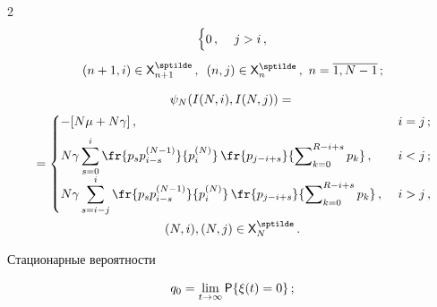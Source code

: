 \begin{multicols}{2}
\begin{multline}
\begin{cases}
  0\,, &\ j>i\,,

  \end{cases}\\[5pt]

    (n+1,i)\in {\sf X}^{\sptilde}_{n+1}\,,\enskip

  (n,j)\in {\sf X}_n^{\sptilde}\,,\ n=\overline{1,N-1}\,;

  \label{e3-sop}

  \end{multline}

  

  \vspace*{-12pt}

  

  \noindent

  \begin{multline}

  \psi_N(I(N,i), I(N,j))={}\\

  {}=\begin{cases}

  -[N\mu +N\gamma]\,, &\ i=j\,;\\[5pt]

  \displaystyle N\gamma \sum\limits_{s=0}^i  \fr{p_s p_{i-s}^{(N-

1)}}{p_i^{(N)}}\,\fr{p_{j-i+s}} {\sum\nolimits_{k=0}^{R-i+s} p_k}\,, &\ i<j\,;\\[5pt]

  \displaystyle N\gamma \sum\limits^i_{s=i-j} \fr{p_s p_{i-s}^{(N-

1)}}{p_i^{(N)}}\,\fr{p_{j-i+s}}{\sum\nolimits_{k=0}^{R-i+s} p_k}\,, &\ i>j\,,

  \end{cases}\\

  (N,i),(N,j)\in {\sf X}_N^{\sptilde}\,.

  \label{e4-sop}

  \end{multline}

  


  

  Стационарные вероятности 

  \begin{align}

  q_0 &= \lim\limits_{t\to\infty} {\sf P}\{\xi(t)=0\}\,;\label{e5-sop}

\\


\end{align}
\end{multicols}
